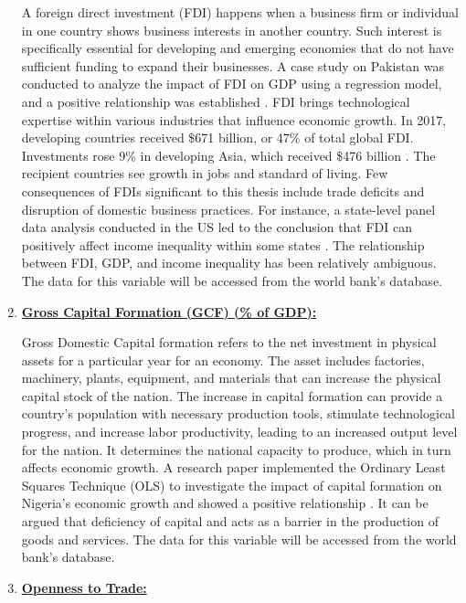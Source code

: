 \begin{enumerate}
A foreign direct investment (FDI) happens when a business firm or individual in one country shows business interests in another country. Such interest is specifically essential for developing and emerging economies that do not have sufficient funding to expand their businesses. A case study on Pakistan was conducted to analyze the impact of FDI on GDP using a regression model, and a positive relationship was established \cite{iqbal2014impact}. FDI brings technological expertise within various industries that influence economic growth. In 2017, developing countries received \$671 billion, or 47\% of total global FDI. Investments rose 9\% in developing Asia, which received \$476 billion \cite{nachum2001united}. The recipient countries see growth in jobs and standard of living. Few consequences of FDIs significant to this thesis include trade deficits and disruption of domestic business practices. For instance, a state-level panel data analysis conducted in the US led to the conclusion that FDI can positively affect income inequality within some states \cite{chintrakarn2012fdi}. The relationship between FDI, GDP, and income inequality has been relatively ambiguous. The data for this variable will be accessed from the world bank’s database.

\item \underline{\textbf{Gross Capital Formation (GCF) (\% of GDP):}}

Gross Domestic Capital formation refers to the net investment in physical assets for a particular year for an economy. The asset includes factories, machinery, plants, equipment, and materials that can increase the physical capital stock of the nation. The increase in capital formation can provide a country’s population with necessary production tools, stimulate technological progress, and increase labor productivity, leading to an increased output level for the nation. It determines the national capacity to produce, which in turn affects economic growth. A research paper implemented the Ordinary Least Squares Technique (OLS) to investigate the impact of capital formation on Nigeria’s economic growth and showed a positive relationship \cite{ugochukwu2013impact}. It can be argued that deficiency of capital and acts as a barrier in the production of goods and services. The data for this variable will be accessed from the world bank’s database.

\item \underline{\textbf{Openness to Trade:}}


\end{enumerate}
